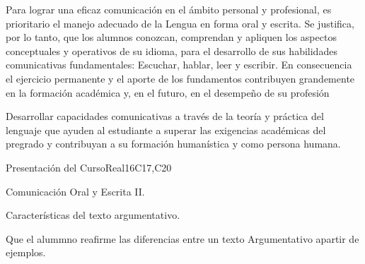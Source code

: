 \begin{syllabus}


\begin{justification}
Para lograr una eficaz comunicación en el ámbito personal y profesional, es prioritario el manejo adecuado de la Lengua en forma oral y escrita. Se justifica, por lo tanto, que los alumnos  conozcan, comprendan y apliquen los aspectos conceptuales y operativos de su idioma, para el desarrollo de sus habilidades comunicativas fundamentales: Escuchar, hablar, leer y escribir.
En consecuencia el ejercicio permanente y el aporte de los fundamentos contribuyen grandemente en la formación académica y, en el futuro, en el desempeño de su profesión
\end{justification}

\begin{goals}
\item Desarrollar capacidades comunicativas a través de la teoría y práctica del lenguaje que ayuden al estudiante a superar las exigencias académicas del pregrado y contribuyan a su formación humanística y como persona humana.
\end{goals}

\begin{outcomes}
   \item {}
   \item {}
   \item {}
\end{outcomes}

\begin{competences}
    \item {}
    \item {}
    \item {}
\end{competences}

\begin{unit}{Presentación del Curso}{}{Real}{16}{C17,C20}
  \begin{topics}
      \item Comunicación Oral y Escrita II.
      \item Características del texto argumentativo.
  \end{topics}

  \begin{learningoutcomes}
   \item Que el alummno reafirme las diferencias entre un texto Argumentativo apartir de ejemplos.
  \end{learningoutcomes}
\end{unit}


\end{syllabus}
